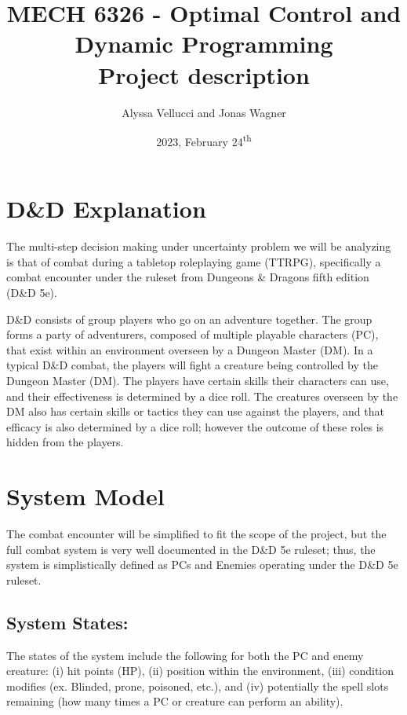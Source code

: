 \documentclass[9pt, onecolumn]{report}
\title{
    MECH 6326 - Optimal Control and Dynamic Programming \\ 
    Project description
}
\author{Alyssa Vellucci and Jonas Wagner}
\date{2023, February 24\textsuperscript{th}}
\begin{document}
\maketitle

\section*{D\&D Explanation}
The multi-step decision making under uncertainty problem we will be analyzing is that of combat during a tabletop roleplaying game (TTRPG), specifically a combat encounter under the ruleset from Dungeons \& Dragons fifth edition (D\&D 5e).

D\&D consists of group players who go on an adventure together.
The group forms a party of adventurers, composed of multiple playable characters (PC), that exist within an environment overseen by a Dungeon Master (DM).
In a typical D\&D combat, the players will fight a creature being controlled by the Dungeon Master (DM). 
The players have certain skills their characters can use, and their effectiveness is determined by a dice roll. 
The creatures overseen by the DM also has certain skills or tactics they can use against the players, and that efficacy is also determined by a dice roll; however the outcome of these roles is hidden from the players. 

\section*{System Model}
The combat encounter will be simplified to fit the scope of the project, but the full combat system is very well documented in the D\&D 5e ruleset; thus, the system is simplistically defined as PCs and Enemies operating under the D\&D 5e ruleset.

\subsection*{System States:}
The states of the system include the following for both the PC and enemy creature: 
(i) hit points (HP), 
(ii) position within the environment, 
(iii) condition modifies (ex. Blinded, prone, poisoned, etc.),
and (iv) potentially the spell slots remaining (how many times a PC or creature can perform an ability).
\end{document}
